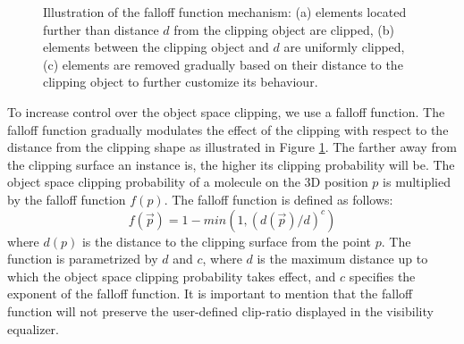 \begin{figure}[t]
\centering
{}
\caption{\label{fig:falloff} 
Illustration of the falloff function mechanism: (a) elements located further than distance $d$ from the clipping object  are clipped, (b) elements between the clipping object and $d$ are uniformly clipped, (c) elements are removed gradually based on their distance to the clipping object to further customize its behaviour.}
\vspace{-5mm}
\end{figure}


To increase control over the object space clipping, we use a falloff function. 
The falloff function gradually modulates the effect of the clipping with respect to the distance from the clipping shape as illustrated in Figure \ref{fig:falloff}.
The farther away from the clipping surface an instance is, the higher its clipping probability will be.
The object space clipping probability of a molecule on the 3D position $p$ is multiplied by the falloff function $f(p)$. The falloff function is defined as follows:
\begin{equation}
	f(\vec{p}) = 1 - min(1, (d(\vec{p}) / d) ^ c)
\end{equation}
where $d(p)$ is the distance to the clipping surface from the point $p$. 
The function is parametrized by $d$ and $c$, where $d$ is the maximum distance up to which the object space clipping probability takes effect, and $c$ specifies the exponent of the falloff function.
It is important to mention that the falloff function will not preserve the user-defined clip-ratio displayed in the visibility equalizer.

